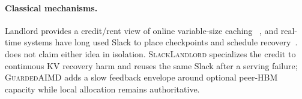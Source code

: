 \paragraph{Classical mechanisms.}
Landlord provides a credit/rent view of online variable-size caching
~\cite{young2002online}, and real-time systems have long used Slack to place
checkpoints and schedule recovery~\cite{melhem2004interplay,acharya2008dynamic}.
\system{} does not claim either idea in isolation.  \textsc{SlackLandlord}
specializes the credit to continuous KV recovery harm and reuses the same Slack
after a serving failure; \textsc{GuardedAIMD} adds a slow feedback envelope
around optional peer-HBM capacity while local allocation remains authoritative.
